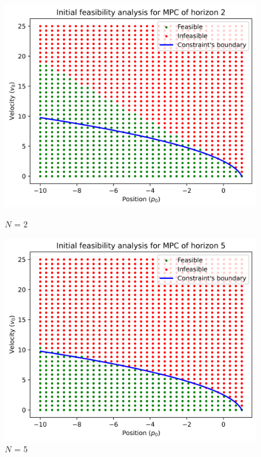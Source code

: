\documentclass[]{article}
\begin{document}
\begin{figure}[H]
    \centering
    \begin{minipage}{0.7\textwidth}
        \centering
        \includegraphics[width=\textwidth]{images/Assignment_24_N2.png}
        \caption{$N$ = 2}
        \label{fig:assignment2_4_1}
    \end{minipage}
    \hfill
    \begin{minipage}{0.7\textwidth}
        \centering
        \includegraphics[width=\textwidth]{images/Assignment_24_N5.png}
        \caption{$N$ = 5}
        \label{fig:assignment2_4_2}
    \end{minipage}
\end{figure}
\end{document}
